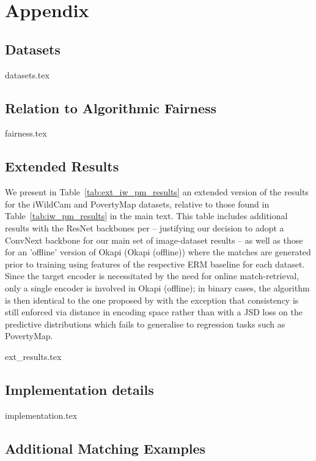 \section{Appendix}\label{sec:appendices}
\subsection{Datasets}\label{appx:datasets}
{datasets.tex}

\subsection{Relation to Algorithmic Fairness}\label{appx:fairness}
{fairness.tex}

\subsection{Extended Results}\label{appx:ext_results}

We present in Table~\ref{tab:ext_iw_pm_results} an extended version of the results for the iWildCam
and PovertyMap datasets, relative to those found in Table~\ref{tab:iw_pm_results} in the main text.
%
This table includes additional results with the ResNet backbones per \citet{SagWeiLeeGaoetal22} --
justifying our decision to adopt a ConvNext backbone for our main set of image-dataset results --
as well as those for an 'offline' version of Okapi (Okapi (offline)) where the matches are
generated prior to training using features of the respective \ac{ERM} baseline for each dataset. 
%
Since the target encoder is necessitated by the need for online match-retrieval, only a single
encoder is involved in Okapi (offline); in binary cases, the algorithm is then identical to the one
proposed by \citet{RomInsShaQua22} with the exception that consistency is still enforced via
distance in encoding space rather than with a JSD loss on the predictive distributions which fails
to generalise to regression tasks such as PovertyMap.

{ext_results.tex}

\subsection{Implementation details}\label{appx:implementation}
{implementation.tex}

\subsection{Additional Matching Examples}\label{appx:additional_matches}

